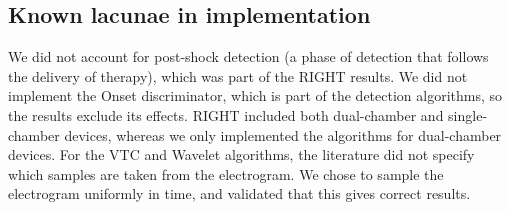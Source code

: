 \subsection{Known lacunae in implementation}
\label{sec:discussion}
We did not account for post-shock detection (a phase of detection that follows the delivery of therapy), which was part of the RIGHT results.
We did not implement the Onset discriminator, which is part of the detection algorithms, so the results exclude its effects.
RIGHT included both dual-chamber and single-chamber devices, whereas we only implemented the algorithms for dual-chamber devices.
For the VTC and Wavelet algorithms, the literature did not specify which samples are taken from the electrogram. 
We chose to sample the electrogram uniformly in time, and validated that this gives correct results.